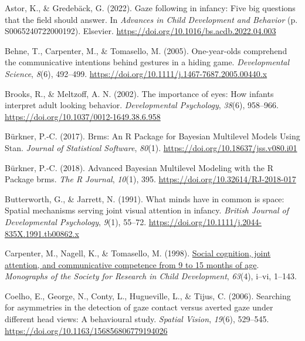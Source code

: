 \documentclass[
  man,floatsintext]{apa6}
\newlength{\cslhangindent}
\newlength{\cslentryspacingunit} %
\newenvironment{CSLReferences}[2] %
 {%
  \setlength{\parindent}{0pt}
  \ifodd #1
  \let\oldpar\par
  \def\par{\hangindent=\cslhangindent\oldpar}
  \fi
  \setlength{\parskip}{#2\cslentryspacingunit}
 }%
 {}
\begin{document}
\hypertarget{refs}{}
\begin{CSLReferences}{1}{0}
\leavevmode{}%
Astor, K., \& Gredebäck, G. (2022). Gaze following in infancy: {Five} big questions that the field should answer. In \emph{Advances in {Child Development} and {Behavior}} (p. S0065240722000192). {Elsevier}. \url{https://doi.org/10.1016/bs.acdb.2022.04.003}

\leavevmode{}%
Behne, T., Carpenter, M., \& Tomasello, M. (2005). One-year-olds comprehend the communicative intentions behind gestures in a hiding game. \emph{Developmental Science}, \emph{8}(6), 492--499. \url{https://doi.org/10.1111/j.1467-7687.2005.00440.x}

\leavevmode{}%
Brooks, R., \& Meltzoff, A. N. (2002). The importance of eyes: {How} infants interpret adult looking behavior. \emph{Developmental Psychology}, \emph{38}(6), 958--966. \url{https://doi.org/10.1037/0012-1649.38.6.958}

\leavevmode{}%
Bürkner, P.-C. (2017). Brms: {An R Package} for {Bayesian Multilevel Models Using Stan}. \emph{Journal of Statistical Software}, \emph{80}(1). \url{https://doi.org/10.18637/jss.v080.i01}

\leavevmode{}%
Bürkner, P.-C. (2018). Advanced {Bayesian Multilevel Modeling} with the {R Package} brms. \emph{The R Journal}, \emph{10}(1), 395. \url{https://doi.org/10.32614/RJ-2018-017}

\leavevmode{}%
Butterworth, G., \& Jarrett, N. (1991). What minds have in common is space: {Spatial} mechanisms serving joint visual attention in infancy. \emph{British Journal of Developmental Psychology}, \emph{9}(1), 55--72. \url{https://doi.org/10.1111/j.2044-835X.1991.tb00862.x}

\leavevmode{}%
Carpenter, M., Nagell, K., \& Tomasello, M. (1998). \href{https://www.ncbi.nlm.nih.gov/pubmed/9835078}{Social cognition, joint attention, and communicative competence from 9 to 15 months of age}. \emph{Monographs of the Society for Research in Child Development}, \emph{63}(4), i--vi, 1--143.

\leavevmode{}%
Coelho, E., George, N., Conty, L., Hugueville, L., \& Tijus, C. (2006). Searching for asymmetries in the detection of gaze contact versus averted gaze under different head views: A behavioural study. \emph{Spatial Vision}, \emph{19}(6), 529--545. \url{https://doi.org/10.1163/156856806779194026}


\end{CSLReferences}
\end{document}
